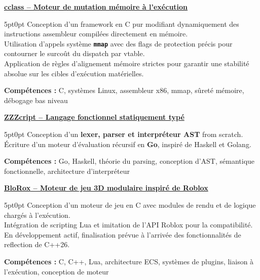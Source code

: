 \documentclass[9pt]{extarticle}
\begin{document}
\par\vspace{8pt}

\underline{\bfseries \href{https://github.com/paulogarithm/cclass}{cclass} -- Moteur de mutation mémoire à l'exécution}
\par
\begin{adjustwidth}{5pt}{0pt}
    Conception d'un framework en C pur modifiant dynamiquement des instructions assembleur compilées directement en mémoire. \\
    Utilisation d'appels système {\bfseries \texttt{mmap}} avec des flags de protection précis pour contourner le surcoût du dispatch par vtable. \\
    Application de règles d'alignement mémoire strictes pour garantir une stabilité absolue sur les cibles d'exécution matérielles.
\end{adjustwidth}
\par
{\bfseries Compétences :} C, systèmes Linux, assembleur x86, mmap, sûreté mémoire, débogage bas niveau

\par\vspace{8pt}

\underline{\bfseries \href{https://github.com/paulogarithm/zzzcript}{ZZZcript} -- Langage fonctionnel statiquement typé}
\par
\begin{adjustwidth}{5pt}{0pt}
	Conception d'un {\bfseries lexer, parser et interpréteur AST} from scratch. \\
	Écriture d'un moteur d'évaluation récursif en {\bfseries Go}, inspiré de Haskell et Golang.
\end{adjustwidth}
\par
{\bfseries Compétences :} Go, Haskell, théorie du parsing, conception d'AST, sémantique fonctionnelle, architecture d'interpréteur

\par\vspace{8pt}

\underline{\bfseries \href{https://github.com/paulogarithm/blorox}{BloRox} -- Moteur de jeu 3D modulaire inspiré de Roblox}
\par
\begin{adjustwidth}{5pt}{0pt}
	Conception d'un moteur de jeu en C avec modules de rendu et de logique chargés à l'exécution. \\
	Intégration de scripting Lua et imitation de l'API Roblox pour la compatibilité. \\
	En développement actif, finalisation prévue à l'arrivée des fonctionnalités de reflection de C++26.
\end{adjustwidth}
\par
{\bfseries Compétences :} C, C++, Lua, architecture ECS, systèmes de plugins, liaison à l'exécution, conception de moteur
\end{document}
